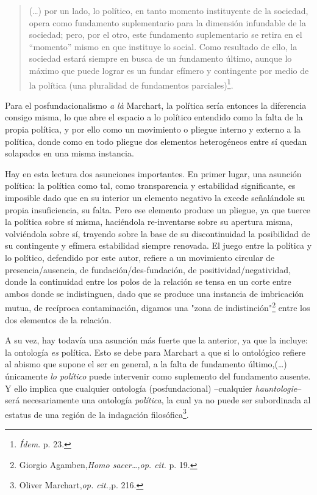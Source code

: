 \documentclass{book}
\begin{document}
\begin{quote}
(\dots) por un lado, lo político, en tanto momento instituyente de
la sociedad, opera como fundamento suplementario para la dimensión
infundable de la sociedad; pero, por el otro, este fundamento
suplementario se retira en el ``momento'' mismo en que instituye lo
social. Como resultado de ello, la sociedad estará siempre en busca de
un fundamento último, aunque lo máximo que puede lograr es un fundar
efímero y contingente por medio de la política (una pluralidad de
fundamentos parciales)\footnote{\emph{Ídem}. p. 23.}.
\end{quote}

Para el posfundacionalismo \emph{a là} Marchart, la política sería
entonces la diferencia consigo misma, lo que abre el espacio a lo
político entendido como la falta de la propia política, y por ello como
un movimiento o pliegue interno y externo a la política, donde como en
todo pliegue dos elementos heterogéneos entre sí quedan solapados en una
misma instancia.

Hay en esta lectura dos asunciones importantes. En primer lugar, una
asunción política: la política como tal, como transparencia y
estabilidad significante, es imposible dado que en su interior un
elemento negativo la excede señalándole su propia insuficiencia, su
falta. Pero ese elemento produce un pliegue, ya que tuerce la política
sobre sí misma, haciéndola re-inventarse sobre su apertura misma,
volviéndola sobre sí, trayendo sobre la base de su discontinuidad la
posibilidad de su contingente y efímera estabilidad siempre renovada. El
juego entre la política y lo político, defendido por este autor, refiere
a un movimiento circular de presencia/ausencia, de
fundación/des-fundación, de positividad/negatividad, donde la
continuidad entre los polos de la relación se tensa en un corte entre
ambos donde se indistinguen, dado que se produce una instancia de
imbricación mutua, de recíproca contaminación, digamos una "zona de
indistinción"\footnote{Giorgio Agamben,\emph{Homo sacer\ldots,op. cit.}
  p. 19.} entre los dos elementos de la relación.

A su vez, hay todavía una asunción más fuerte que la anterior, ya que la
incluye: la ontología \emph{es} política. Esto se debe para Marchart a
que si lo ontológico refiere al abismo que supone el ser en general, a
la falta de fundamento último,(\dots) únicamente \emph{lo político}
puede intervenir como suplemento del fundamento ausente. Y ello implica
que cualquier ontología (posfundacional) --cualquier
\emph{hauntologie}-- será necesariamente una ontología \emph{política},
la cual ya no puede ser subordinada al estatus de una región de la
indagación filosófica\footnote{Oliver Marchart,\emph{op. cit.,}p. 216.}.
\end{document}

